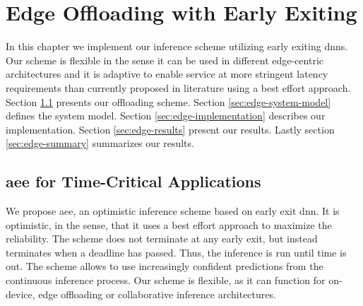 \hypertarget{earlyexiting}{%
	\chapter{Edge Offloading with Early Exiting}\label{ch:edgeoffloading}}
\thispagestyle{fancy}

In this chapter we implement our inference scheme utilizing early exiting \gls{dnn}s. Our scheme is flexible in the sense it can be used in different edge-centric architectures and it is adaptive to enable service at more stringent latency requirements than currently proposed in literature using a best effort approach. Section \ref{sec:edge-aee} presents our offloading scheme. Section \ref{sec:edge-system-model} defines the system model. Section \ref{sec:edge-implementation} describes our implementation. Section \ref{sec:edge-results} present our results. Lastly section \ref{sec:edge-summary} summarizes our results.

\section{\acrfull{aee} for Time-Critical Applications} \label{sec:edge-aee}

We propose \acrfull{aee}, an optimistic inference scheme based on early exit \gls{dnn}. It is optimistic, in the sense, that it uses a best effort approach to maximize the reliability. The scheme does not terminate at any early exit, but instead terminates when a deadline has passed. Thus, the inference is run until time is out. The scheme allows to use increasingly confident predictions from the continuous inference process. Our scheme is flexible, as it can function for on-device, edge offloading or collaborative inference architectures. 

